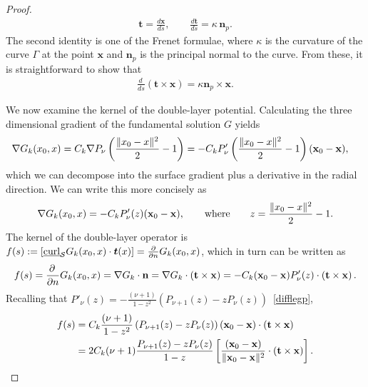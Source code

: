 \begin{proof}
\begin{align*}
  \mathbf{t} = \frac{d\mathbf{x}}{ds}, \qquad 
  \frac{d\mathbf{t}}{ds} = \kappa \, \mathbf{n}_{p}.
\end{align*}
The second identity is one of the Frenet formulae, where $\kappa$ is
the curvature of the curve $\Gamma$ at the point $\mathbf{x}$ and
$\mathbf{n}_{p}$ is the principal normal to the curve.  From these, it
is straightforward to show that 
\begin{align*}
  \frac{d \, }{ds} \left( \mathbf{t} \times \mathbf{x} \right)=
  \kappa \mathbf{n}_{p} \times \mathbf{x} . 
\end{align*}

We now examine the kernel of the double-layer potential. Calculating the
three dimensional gradient of the fundamental solution $G$ yields
\begin{align*}
  \nabla G_k(x_0,x) &= C_k \nabla P_\nu\left(
    \frac{\|x_0-x\|^2}{2}-1\right) = 
  -C_k P'_\nu\left(\frac{\|x_0-x\|^2}{2}-1\right)
    (\mathbf{x}_{0}-\mathbf{x}),
\end{align*}
which we can decompose into the surface gradient plus a derivative in
the radial direction. We can write this more concisely as
\begin{align*}
\nabla G_k(x_0,x)=-C_k P'_{\nu}(z) (\mathbf{x}_0-\mathbf{x}), 
  \qquad \mbox{where}\qquad z=\frac{\|{ x_0}-{x}\|^2}{2}-1.
\end{align*} 
The kernel of the double-layer operator is $f(s): =
[\underline{\mbox{curl}}_{\S}G_{k}(x_{0},x) \cdot \vec{t}(x)]=
\frac{\partial}{\partial n} G_k({x}_{0},{x})$, which in turn can be
written as 
\begin{align*}
 f(s)=\frac{\partial \, }{\partial n} G_{k}(x_{0},x) 
 =\nabla G_{k} \cdot \mathbf{n} = \nabla G_k\cdot \left( \mathbf{t}
 \times \mathbf{x} \right) 
 =-C_k (\mathbf{x}_0-\mathbf{x})P'_{\nu}(z)\cdot \left(
 \mathbf{t} \times \mathbf{x} \right).
\end{align*}
Recalling that $P'_{\nu}(z)=-\frac{(\nu+1)}{1-z^2}(P_{\nu+1}(z)-z
P_{\nu}(z))$~\eqref{difflegp},
\begin{align}
  f(s) &= C_k \frac{(\nu+1)}{1-z^2}\left(
  P_{\nu+1}(z)-zP_{\nu}(z)\right) 
  (\mathbf{x}_0-\mathbf{x})\cdot \left(
  \mathbf{t} \times {\mathbf x} \right) \nonumber\\
  &= 2C_k(\nu+1)\frac{P_{\nu+1}(z)-zP_{\nu}(z)}{1-z} \left[
  \frac{(\mathbf{x}_0-\mathbf{x})}{\|\mathbf{x}_{0}-\mathbf{x}\|^2}
  \cdot \left( \mathbf{t} \times \mathbf{x} \right)\right].
  \label{kern1}
\end{align} 


\end{proof}
